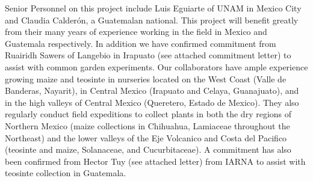 Senior Personnel on this project include Luis Eguiarte of UNAM in Mexico City and Claudia Calder\'{o}n, a Guatemalan national.  This project will benefit greatly from their many years of experience working in the field in Mexico and Guatemala respectively.  In addition we have confirmed commitment from Ruairidh Sawers of Langebio in Irapuato (see attached commitment letter) to assist with common garden experiments.  Our collaborators have ample experience growing maize and teosinte in nurseries located on the West Coast (Valle de Banderas, Nayarit), in Central Mexico (Irapuato and Celaya, Guanajuato), and in the high valleys of Central Mexico (Queretero, Estado de Mexico). They also regularly conduct field expeditions to collect plants in both the dry regions of Northern Mexico (maize collections in Chihuahua, Lamiaceae throughout the Northeast) and the lower valleys of the Eje Volcanico and Costa del Pacifico (teosinte and maize, Solanaceae, and Cucurbitaceae).  A commitment has also been confirmed from Hector Tuy (see attached letter) from IARNA to assist with teosinte collection in Guatemala.